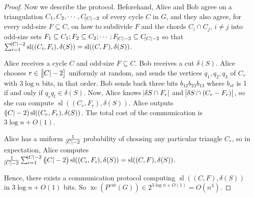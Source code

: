 \documentclass{article}
\DeclareMathOperator{\xc}{xc}
\DeclareMathOperator{\Sl}{sl}
\begin{document}
\begin{proof}
Now we describe the protocol. Beforehand, Alice and Bob agree
on a triangulation $C_1, C_2, \cdots, C_{\abs{C}-2}$ of every cycle $C$ in $G$,
and they also agree, for every odd-size $F\subseteq C$, on how to subdivide
$F$ and the chords $C_i\cap C_j$, $i\neq j$ into odd-size sets 
	$F_1\subseteq C_1; F_2\subseteq C_2;\cdots; F_{\abs{C}-2}\subseteq C_{\abs{C}-2}$ so that $\sum_{i=1}^{\abs{C}-2} \Sl((C_i, F_i),\delta(S)) = \Sl((C, F), \delta(S))$.

Alice receives a cycle $C$ and odd-size $F\subseteq C$. Bob receives
a cut $\delta(S)$. Alice chooses $r\in \sbr{\abs{C}-2}$ uniformly
at random, and sends the vertices $q_1,q_2,q_3$ of $C_r$ with $3\log n$ bits,
in that order.
Bob sends back three bits $b_{12}b_{23}b_{13}$ where $b_{st}$ is 1
if and only if $q_sq_t \in\delta(S)$.
Now, Alice knows $\abs{\delta{S}\cap F_r}$ and $\abs{\delta{S}\cap (C_r-F_r)}$,
so she can compute $\Sl((C_r, F_r),\delta(S))$. Alice outputs
$(\abs{C}-2)\Sl((C_r,F_r),\delta(S))$. The total cost
of the communication is $3\log n + O(1)$.

Alice has a uniform $\frac{1}{\abs{C}-2}$ probability of choosing
any particular triangle $C_r$, so in expectation, Alice computes
$\frac{1}{\abs{C}-2}\sum_{i=1}^{\abs{C}-2}\del{\abs{C}-2}\Sl((C_i,F_i),\delta(S)) = \Sl((C,F), \delta(S))$. 

Hence, there exists a communication protocol computing 
$\Sl((C,F), \delta(S))$ in $3\log n+O(1)$ bits. 
So $\xc(P^{\text{cut}}(G)) \in 2^{3\log n + O(1)} = O(n^3)$. 
\end{proof}
\end{document}
